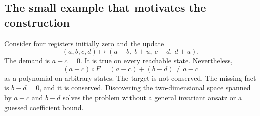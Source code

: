 \subsection{The small example that motivates the construction}
Consider four registers initially zero and the update
\begin{equation}\label{eq:delayed}
 (a,b,c,d)\longmapsto(a+b,\ b+u,\ c+d,\ d+u).
\end{equation}
The demand is $a-c=0$. It is true on every reachable state. Nevertheless,
\[
 (a-c)\circ F=(a-c)+(b-d)\ne a-c
\]
as a polynomial on arbitrary states. The target is not conserved. The missing
fact is $b-d=0$, and it is conserved. Discovering the two-dimensional space
spanned by $a-c$ and $b-d$ solves the problem without a general invariant
ansatz or a guessed coefficient bound.
